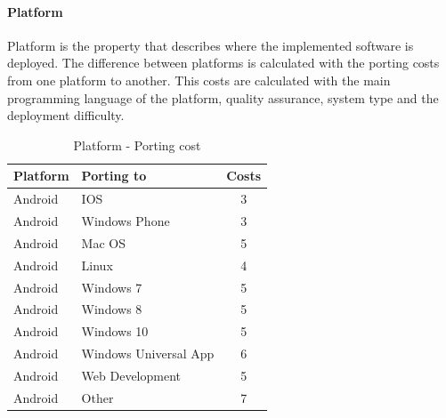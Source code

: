 \paragraph*{\textbf{Platform}}
Platform is the property that describes where the implemented software is deployed. The difference between platforms is calculated with the porting costs from one platform to another. This costs are calculated with the main programming language of the platform, quality assurance, system type and the deployment difficulty.\\
\begin{table}[h]
	\centering 
	\setlength{\tabcolsep}{4pt}
	\begin{tabular}{|l|l|c|}\hline
		Platform			& Porting to 	&  Costs 	\\ \hline
		Android   			& IOS					& 3      		\\ \hline
		Android   			& Windows Phone 		& 3      		\\ \hline
		Android   			& Mac OS 				& 5     		\\ \hline
		Android   			& Linux 				& 4     		\\ \hline
		Android  			& Windows 7 			& 5     		\\ \hline
		Android  			& Windows 8				& 5     		\\ \hline
		Android  			& Windows 10 			& 5     		\\ \hline
		Android  			& Windows Universal App	& 6     		\\ \hline
		Android  			& Web Development 		& 5     		\\ \hline
		Android  			& Other 				& 7     		\\ \hline
	\end{tabular} 
	\caption{Platform - Porting cost} 
	\label{property:platform} 
\end{table}\newpage


